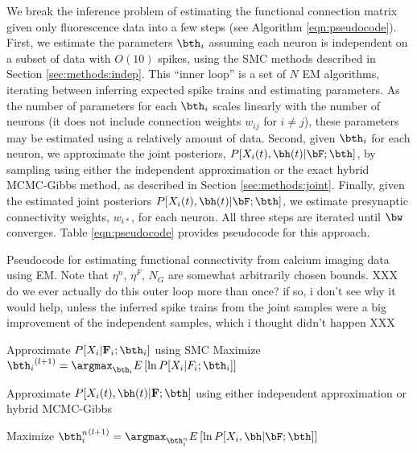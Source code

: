 We break the inference problem of estimating the functional connection matrix given only fluorescence data into a few  steps (see Algorithm \ref{eqn:pseudocode}).  First, we estimate the parameters $\bth_i$ assuming each neuron is independent on a subset of data with $O(10)$ spikes, using the SMC methods described in Section \ref{sec:methods:indep}.  This ``inner loop'' is a set of $N$ EM algorithms, iterating between inferring expected spike trains and estimating parameters. As the number of parameters for each $\bth_i$ scales linearly with the number of neurons (it does not include connection weights $w_{ij}$ for $i\neq j$), these parameters may be estimated using a relatively amount of data.  Second, given $\bth_i$ for each neuron, we approximate the joint posteriors, $P[X_i(t), \bh(t) | \bF; \bth]$, by sampling using either the independent approximation or the exact hybrid MCMC-Gibbs method, as described in Section \ref{sec:methods:joint}.  Finally, given the estimated joint posteriors $P[X_i(t), \bh(t) | \bF; \bth]$, we estimate presynaptic connectivity weights, $w_{i \ast}$, for each neuron.  All three steps are iterated until $\bw$ converges. Table \ref{eqn:pseudocode} provides pseudocode for this approach.  

\begin{algorithm}
\caption{Pseudocode for estimating functional connectivity from calcium imaging data using EM. Note that $\eta^n$, $\eta^F$, $N_G$ are somewhat arbitrarily chosen bounds.  XXX do we ever actually do this outer loop more than once? if so, i don't see why it would help, unless the inferred spike trains from the joint samples were a big improvement of the independent samples, which i thought didn't happen XXX}
\label{eqn:pseudocode}
\begin{algorithmic}
      \State Approximate $P[X_i|{\bf F}_i; \bth_i]$ using SMC
      \State Maximize ${\bth_i}^{(l+1)}=\argmax_{\bth_i} E\left[\ln P[X_i | F_i; \bth_i] \right]$
    \EndWhile
  \EndFor
  
      \State Approximate $P[X_i(t), \bh(t) |{\bf F}; \bth]$ using either independent approximation or hybrid MCMC-Gibbs
    \EndFor

  	\State Maximize ${\bth^n_i}^{(l+1)}=\argmax_{\bth^n_i} E\left[\ln P[X_i, \bh | \bF; \bth]\right]$  
  \EndFor

\EndWhile
\end{algorithmic}
\end{algorithm}

